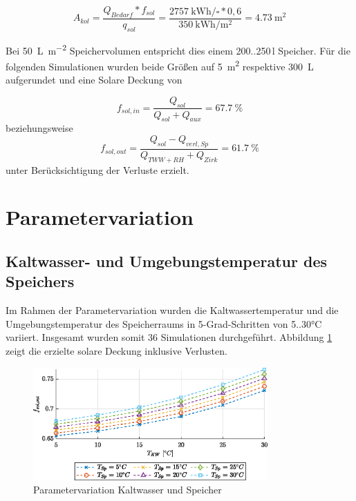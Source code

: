\begin{equation}
	\label{eq:}
	A_{kol}=\frac{Q_{Bedarf}*f_{sol}}{q_{sol}}=\frac{\SI{2757}{\kilo\watt\hour\per\square}*0,6}{\SI{350}{\kilo\watt\hour\per\square\meter}}=\SI{4,73}{\square\meter}
\end{equation}

Bei \SI{50}{\liter\per\square\meter} Speichervolumen entspricht dies einem 200..250\,l Speicher. Für die folgenden Simulationen wurden beide Größen auf \SI{5}{\square\meter} respektive \SI{300}{\liter} aufgerundet und eine Solare Deckung von

\begin{equation}
	\label{eq:fsolin}
	f_{sol,in} = \frac{Q_{sol}}{Q_{sol}+Q_{aux}} =\SI{67,7}{\percent}
\end{equation}
beziehungsweise
\begin{equation}
	\label{eqfsolout:}
	f_{sol,out} = \frac{Q_{sol}-Q_{verl,Sp}}{Q_{TWW+RH}+Q_{Zirk}}=\SI{61,7}{\percent}
\end{equation}
unter Berücksichtigung der Verluste erzielt.

\section{Parametervariation}
\subsection{Kaltwasser- und Umgebungstemperatur des Speichers}
Im Rahmen der Parametervariation wurden die Kaltwassertemperatur und die Umgebungstemperatur des Speicherraums in 5-Grad-Schritten von 5..30\si{\celsius} variiert. Insgesamt wurden somit 36 Simulationen durchgeführt. Abbildung \ref{fig:par1} zeigt die erzielte solare Deckung inklusive Verlusten.
\begin{figure}[H]
	\centering
	\includegraphics[width=0.8\textwidth]{../DATA/Aufgabe2.2.eps}
	\caption[Parametervariation Kaltwasser und Speicher]{Parametervariation Kaltwasser und Speicher}
	\label{fig:par1}
\end{figure}

